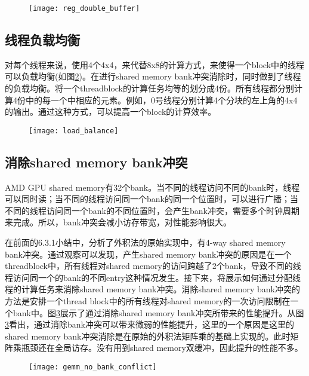 \begin{figure}[htbp]
	\centering
	\texttt{[image: reg\_double\_buffer]}
	\label{fig:reg_double_buffer}
\end{figure}

\subsection{线程负载均衡}
对每个线程来说，使用4个4x4，来代替8x8的计算方式，来使得一个block中的线程可以负载均衡(如图\ref{fig:load_balance})。在进行shared memory bank冲突消除时，同时做到了线程的负载均衡。将一个threadblock的计算任务均等的划分成4份。所有线程都分别计算4份中的每一个中相应的元素。例如，0号线程分别计算4个分块的左上角的4x4的输出。通过这种方式，可以提高一个block的计算效率。
\begin{figure}[htbp]
	\centering
	\texttt{[image: load\_balance]}
	\label{fig:load_balance}
\end{figure}


\subsection{消除shared memory bank冲突}
AMD GPU shared memory有32个bank。当不同的线程访问不同的bank时，线程可以同时读；当不同的线程访问同一个bank的同一个位置时，可以进行广播；当不同的线程访问同一个bank的不同位置时，会产生bank冲突，需要多个时钟周期来完成。所以，bank冲突会减小访存带宽，对性能影响很大。

在前面的6.3.1小结中，分析了外积法的原始实现中，有4-way shared memory bank冲突。通过观察可以发现，产生shared memory bank冲突的原因是在一个threadblock中，所有线程对shared memory的访问跨越了2个bank，导致不同的线程访问同一个的bank的不同entry这种情况发生。接下来，将展示如何通过分配线程的计算任务来消除shared memory bank冲突。消除shared memory bank冲突的方法是安排一个thread block中的所有线程对shared memory的一次访问限制在一个bank中。图\ref{fig:gemm_no_bank_conflict}展示了通过消除shared memory bank冲突所带来的性能提升。从图\ref{fig:gemm_no_bank_conflict}看出，通过消除bank冲突可以带来微弱的性能提升，这里的一个原因是这里的shared memory bank冲突消除是在原始的外积法矩阵乘的基础上实现的。此时矩阵乘瓶颈还在全局访存。没有用到shared memory双缓冲，因此提升的性能不多。

\begin{figure}[htbp]
	\centering
	\texttt{[image: gemm\_no\_bank\_conflict]}
	\label{fig:gemm_no_bank_conflict}
\end{figure}


